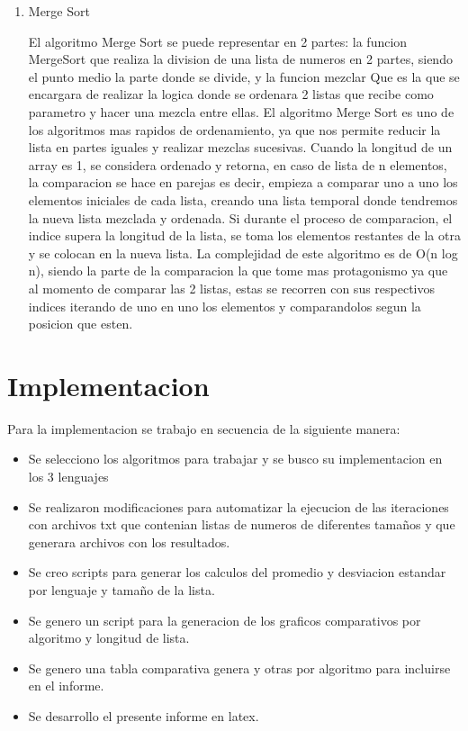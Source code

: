 \documentclass[12pt]{article} %
\begin{document}
\begin{enumerate}
    \item Merge Sort
    
          El algoritmo Merge Sort se puede representar en 2 partes: la funcion MergeSort que realiza la division de una lista de numeros en 2 partes, siendo el punto medio la parte donde se divide, y la funcion mezclar
          Que es la que se encargara de realizar la logica donde se ordenara 2 listas que recibe como parametro y hacer una mezcla entre ellas. El algoritmo Merge Sort es uno de los algoritmos mas rapidos de ordenamiento,
          ya que nos permite reducir la lista en partes iguales y realizar mezclas sucesivas. Cuando la longitud de un array es 1, se considera ordenado y retorna, en caso de lista de n elementos, la comparacion se hace en parejas
          es decir, empieza a comparar uno a uno los elementos iniciales de cada lista, creando una lista temporal donde tendremos la nueva lista mezclada y ordenada. Si durante el proceso de comparacion, el indice supera
          la longitud de la lista, se toma los elementos restantes de la otra y se colocan en la nueva lista. 
          La complejidad de este algoritmo es de O(n log n), siendo la parte de la comparacion la que tome mas protagonismo ya que al momento de comparar las 2 listas, estas se recorren con sus respectivos indices
          iterando de uno en uno los elementos y comparandolos segun la posicion que esten.

\end{enumerate}
\section{Implementacion}

Para la implementacion se trabajo en secuencia de la siguiente manera:
\begin{itemize}
    \item Se selecciono los algoritmos para trabajar y se busco su implementacion en los 3 lenguajes
    \item Se realizaron modificaciones para automatizar la ejecucion de las iteraciones con archivos txt que contenian listas de numeros de diferentes tamaños y que generara archivos con los resultados.
    \item Se creo scripts para generar los calculos del promedio y desviacion estandar por lenguaje y tamaño de la lista.
    \item Se genero un script para la generacion de los graficos comparativos por algoritmo y longitud de lista.
    \item Se genero una tabla comparativa genera y otras por algoritmo para incluirse en el informe.
    \item Se desarrollo el presente informe en latex.
\end{itemize}
\end{document}
